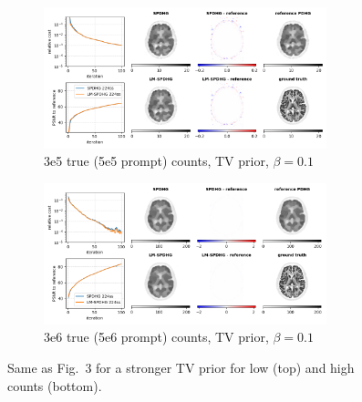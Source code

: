 \documentclass[10pt,twocolumn,twoside]{article}
\begin{document}
\begin{figure}
  \centering
  \begin{subfigure}[]{1.0\textwidth}
    \centering
    \includegraphics[width=0.9\textwidth]{./figureS2a_brain2d_counts_3.0E+05_seed_1_beta_1.0E-01_prior_TV_niter_ref_20000_fwhm_4.5_4.5_niter_100.png}
    \caption{3e5 true (5e5 prompt) counts, TV prior, $\beta = 0.1$}
  \end{subfigure}
  \vfill
  \begin{subfigure}[]{1.0\textwidth}
    \centering
    \includegraphics[width=0.9\textwidth]{./figureS2b_brain2d_counts_3.0E+06_seed_1_beta_1.0E-01_prior_TV_niter_ref_20000_fwhm_4.5_4.5_niter_100.png}
    \caption{3e6 true (5e6 prompt) counts, TV prior, $\beta = 0.1$}
  \end{subfigure}
  \caption{Same as Fig.~3 for a stronger TV prior for low (top) and high counts (bottom).}
\end{figure}
\end{document}
